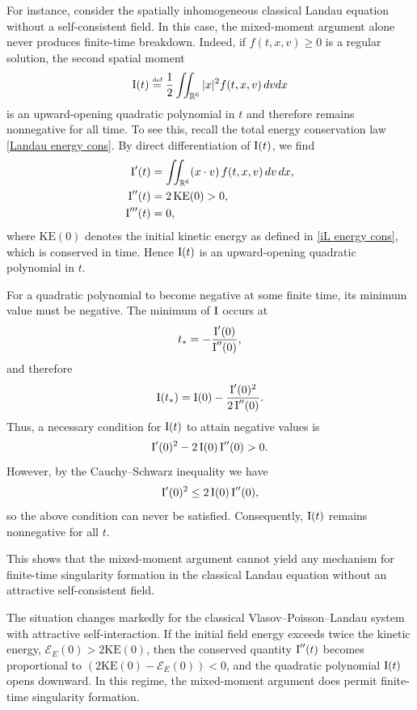 \documentclass[reqno,11pt,final]{amsart}
\theoremstyle{plain}
\numberwithin{equation}{section}
\numberwithin{theorem}{section}
\newcommand{\eqdef }{\overset{\mbox{\tiny{def}}}{=}}
\begin{document}
For instance, consider the spatially inhomogeneous classical Landau equation
without a self-consistent field. In this case, the mixed-moment argument alone never
produces finite-time breakdown. Indeed, if
$f(t,x,v)\ge 0$ is a regular solution, the second spatial moment
$$
\textup{I}(t) \eqdef \frac12 \iint_{\mathbb{R}^6} |x|^2 f(t,x,v)\, dvdx
$$
is an upward-opening quadratic polynomial in $t$ and therefore remains nonnegative
for all time. To see this, recall the total energy conservation law \eqref{Landau energy cons}. By direct
    differentiation of $\textup{I}(t)$, we find
    \begin{align*}
        \textup{I}'(t) &= \iint_{\mathbb{R}^6} (x \cdot v)\, f(t,x,v)\, dv\, dx,\\
        \textup{I}''(t) &= 2\,\mathrm{KE}(0)>0,\\
        \textup{I}'''(t) &= 0,
    \end{align*}
    where $\mathrm{KE}(0)$ denotes the initial kinetic energy as defined in \eqref{iL energy cons}, which is conserved in
    time. Hence $\textup{I}(t)$ is an upward-opening quadratic polynomial in $t$.

    For a quadratic polynomial to become negative at some finite time, its minimum
    value must be negative. The minimum of $\textup{I}$ occurs at
    $$
        t_* = -\frac{\textup{I}'(0)}{\textup{I}''(0)},
    $$
    and therefore
    $$
        \textup{I}(t_*) = \textup{I}(0) - \frac{\textup{I}'(0)^2}{2\,\textup{I}''(0)}.
    $$
    Thus, a necessary condition for $\textup{I}(t)$ to attain negative values is
    $$
        \textup{I}'(0)^2 - 2\,\textup{I}(0)\,\textup{I}''(0) > 0.
    $$
    However, by the Cauchy--Schwarz inequality we have
    $$
        \textup{I}'(0)^2 \le 2\,\textup{I}(0)\,\textup{I}''(0),
    $$
    so the above condition can never be satisfied. Consequently, $\textup{I}(t)$
    remains nonnegative for all $t$.


This shows that the mixed-moment argument cannot yield any mechanism
for finite-time singularity formation in the classical Landau equation without an attractive self-consistent field.

The situation changes markedly for the classical Vlasov--Poisson--Landau system with
attractive self-interaction. If the initial field energy exceeds twice the kinetic energy,
$\mathcal{E}_E(0) > 2\mathrm{KE}(0)$, then the conserved quantity $\textup{I}''(t)$ becomes
proportional to $(2\mathrm{KE}(0) - \mathcal{E}_E(0))<0$, and the quadratic polynomial
$\textup{I}(t)$ opens downward. In this regime, the mixed-moment argument does permit
finite-time singularity formation.
\end{document}
